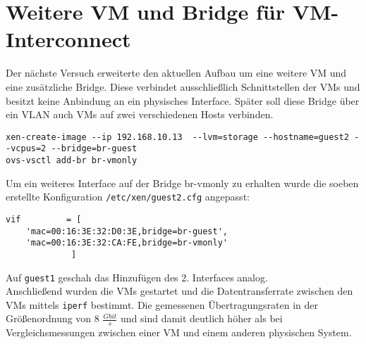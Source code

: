 \section{Weitere VM und Bridge für VM-Interconnect}
Der nächste Versuch erweiterte den aktuellen Aufbau um eine weitere VM und eine zusätzliche Bridge. Diese verbindet ausschließlich Schnittstellen der VMs und besitzt keine Anbindung an ein physisches Interface. Später soll diese Bridge über ein VLAN auch VMs auf zwei verschiedenen Hosts verbinden.
\begin{verbatim}
xen-create-image --ip 192.168.10.13  --lvm=storage --hostname=guest2 --vcpus=2 --bridge=br-guest
ovs-vsctl add-br br-vmonly
\end{verbatim}
Um ein weiteres Interface auf der Bridge br-vmonly zu erhalten wurde die soeben erstellte Konfiguration \verb#/etc/xen/guest2.cfg# angepasst:
\setupVerbatimOut
\begin{verbatim}
vif         = [
    'mac=00:16:3E:32:D0:3E,bridge=br-guest',
    'mac=00:16:3E:32:CA:FE,bridge=br-vmonly' 
             ]
\end{verbatim}
Auf \verb#guest1# geschah das Hinzufügen des 2. Interfaces analog.\\
Anschließend wurden die VMs gestartet und die Datentransferrate zwischen den VMs mittels \verb#iperf# bestimmt. Die gemessenen Übertragungsraten in der Größenordnung von 8 $\frac{Gbit}{s}$ und sind damit deutlich höher als bei Vergleichsmessungen zwischen einer VM und einem anderen physischen System.

